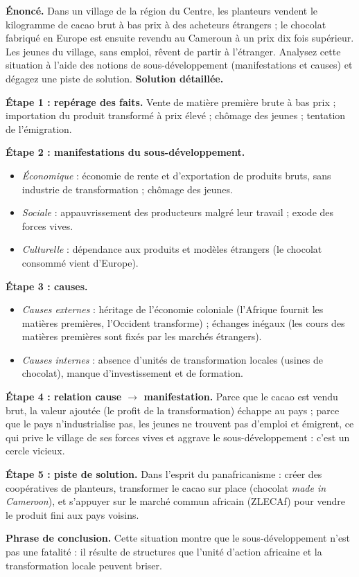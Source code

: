 \documentclass[11pt]{article}
\newcommand{\cle}[1]{{\popxbold\color{popdark}#1}}
\begin{document}
\begin{exoresolu}
\textbf{Énoncé.} Dans un village de la région du Centre, les planteurs vendent le kilogramme de cacao brut à bas prix à des acheteurs étrangers ; le chocolat fabriqué en Europe est ensuite revendu au Cameroun à un prix dix fois supérieur. Les jeunes du village, sans emploi, rêvent de partir à l'étranger. Analysez cette situation à l'aide des notions de sous-développement (manifestations et causes) et dégagez une piste de solution.
\tcblower
\textbf{Solution détaillée.}

\textbf{Étape 1 : repérage des faits.} Vente de matière première brute à bas prix ; importation du produit transformé à prix élevé ; chômage des jeunes ; tentation de l'émigration.

\textbf{Étape 2 : manifestations du sous-développement.}
\begin{itemize}
\item \emph{Économique} : économie de rente et d'exportation de produits bruts, sans industrie de transformation ; chômage des jeunes.
\item \emph{Sociale} : appauvrissement des producteurs malgré leur travail ; exode des forces vives.
\item \emph{Culturelle} : dépendance aux produits et modèles étrangers (le chocolat consommé vient d'Europe).
\end{itemize}

\textbf{Étape 3 : causes.}
\begin{itemize}
\item \emph{Causes externes} : héritage de l'économie coloniale (l'Afrique fournit les matières premières, l'Occident transforme) ; échanges inégaux (les cours des matières premières sont fixés par les marchés étrangers).
\item \emph{Causes internes} : absence d'unités de transformation locales (usines de chocolat), manque d'investissement et de formation.
\end{itemize}

\textbf{Étape 4 : relation cause $\rightarrow$ manifestation.} Parce que le cacao est vendu brut, la \cle{valeur ajoutée} (le profit de la transformation) échappe au pays ; parce que le pays n'industrialise pas, les jeunes ne trouvent pas d'emploi et émigrent, ce qui prive le village de ses forces vives et aggrave le sous-développement : c'est un \cle{cercle vicieux}.

\textbf{Étape 5 : piste de solution.} Dans l'esprit du panafricanisme : créer des coopératives de planteurs, transformer le cacao sur place (chocolat \emph{made in Cameroon}), et s'appuyer sur le marché commun africain (ZLECAf) pour vendre le produit fini aux pays voisins.

\textbf{Phrase de conclusion.} Cette situation montre que le sous-développement n'est pas une fatalité : il résulte de structures que l'unité d'action africaine et la transformation locale peuvent briser.
\end{exoresolu}
\end{document}
